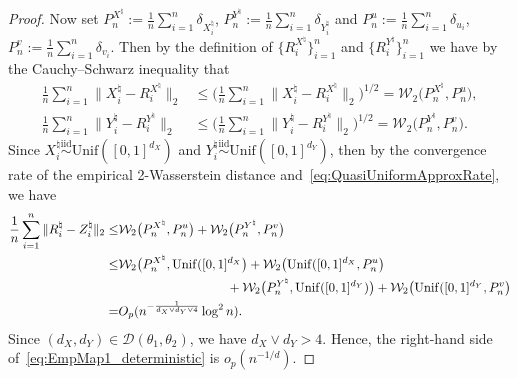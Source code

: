 \documentclass[11pt]{article}
\begin{document}
\begin{proof}
Now set $ P_n^{X^\natural} := \frac{1}{n}\sum_{i = 1}^n \delta_{ X_i^\natural}$, $ P_n^{Y^\natural}:= \frac{1}{n}\sum_{i = 1}^n \delta_{ Y_i^\natural}$ and $ P_n^u := \frac{1}{n}\sum_{i = 1}^n \delta_{u_i}$, $P_n^v := \frac{1}{n}\sum_{i = 1}^n \delta_{v_i}$. Then by the definition of $\{ R_i^{X^\natural}\}_{i = 1}^n$ and $\{ R_i^{Y^\natural}\}_{i = 1}^n$ we have by the Cauchy--Schwarz inequality that 
\begin{align*}
    \frac{1}{n}\sum_{i = 1}^n \| X_i^\natural -  R_i^{X^\natural}\|_2 &\leq \biggl(\frac{1}{n}\sum_{i=1}^n \| X_i^\natural -  R_i^{X^\natural}\|_2\biggr)^{1/2}  = \mathcal{W}_2
    \bigl({P}_n^{X^\natural}, P_n^u\bigr),\\
    \frac{1}{n} \sum_{i = 1}^n \|{Y}_i^\natural - {R}_i^{Y^\natural}\|_2 &\leq \biggl(\frac{1}{n}\sum_{i=1}^n \| Y_i^\natural -  R_i^{Y^\natural}\|_2\biggr)^{1/2} = \mathcal{W}_2\bigl({P}_n^{Y^\natural}, P_n^v\bigr).
\end{align*}
Since $X_i^\natural \stackrel{\mathrm{iid}}{\sim} \mathrm{Unif}([0, 1]^{d_X})$ and $Y_i^\natural \stackrel{\mathrm{iid}}{\sim} \mathrm{Unif}([0, 1]^{d_Y})$, then by the convergence rate of the empirical 2-Wasserstein distance \citep{fournier2015rate} and~\eqref{eq:QuasiUniformApproxRate}, we have
\begin{align}
\frac{1}{n}\sum_{i = 1}^n\|{R}_i^\natural - Z_i^\natural\|_2 \leq& \mathcal{W}_2\bigl({P}_n^{X^\natural}, P_n^u\bigr) + \mathcal{W}_2\bigl({P}_n^{Y^\natural}, P_n^v\bigr) \notag \\ 
\leq& \mathcal{W}_2\bigl({P}_n^{X^\natural}, \mathrm{Unif}([0, 1]^{d_X}\bigr) + \mathcal{W}_2\bigl(\mathrm{Unif}([0, 1]^{d_X}, P_n^u\bigr) \notag \\ 
&\hspace{3cm}+\mathcal{W}_2\bigl({P}_n^{Y^\natural}, \mathrm{Unif}([0, 1]^{d_Y})\bigr) + \mathcal{W}_2\bigl(\mathrm{Unif}([0, 1]^{d_Y}, P_n^v\bigr) \notag \\
=& O_p(n^{-\frac{1}{d_X \vee d_Y \vee 4}} \log^2 n).\label{eq:EmpMap1_deterministic}
\end{align}
Since $(d_X, d_Y) \in\mathcal{D}(\theta_1, \theta_2)$, we have $d_X \vee d_Y > 4$. Hence, the right-hand side of~\eqref{eq:EmpMap1_deterministic} is $o_p(n^{-1/d})$.


\end{proof}
\end{document}
